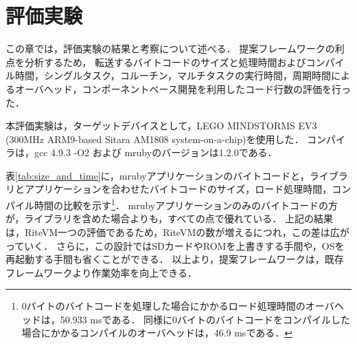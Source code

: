 \documentclass[submit,techrep]{ipsj}
\begin{document}
\section{評価実験}
\vspace{-2mm}
\label{sec:Evaluation}
この章では，評価実験の結果と考察について述べる．
提案フレームワークの利点を分析するため，
転送するバイトコードのサイズと処理時間およびコンパイル時間，シングルタスク，コルーチン，マルチタスクの実行時間，周期時間によるオーバヘッド，コンポーネントベース開発を利用したコード行数の評価を行った．

本評価実験は，ターゲットデバイスとして，LEGO MINDSTORMS EV3 (300MHz ARM9-based Sitara AM1808 system-on-a-chip)を使用した．
コンパイラは，gcc 4.9.3 -O2 および mrubyのバージョンは1.2.0である．

表\ref{tab:size_and_time}に，mrubyアプリケーションのバイトコードと，ライブラリとアプリケーションを合わせたバイトコードのサイズ，ロード処理時間，コンパイル時間の比較を示す\footnote{0バイトのバイトコードを処理した場合にかかるロード処理時間のオーバヘッドは，50.933 msである．
同様に0バイトのバイトコードをコンパイルした場合にかかるコンパイルのオーバヘッドは，46.9 msである．}．
mrubyアプリケーションのみのバイトコードの方が，ライブラリを含めた場合よりも，すべての点で優れている．
上記の結果は，RiteVM一つの評価であるため，RiteVMの数が増えるにつれ，この差は広がっていく．
さらに，この設計ではSDカードやROMを上書きする手間や，OSを再起動する手間も省くことができる．
以上より，提案フレームワークは，既存フレームワークより作業効率を向上できる．
\end{document}
